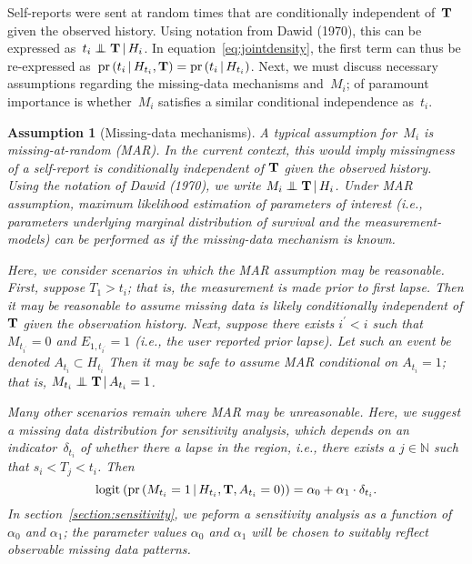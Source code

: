 \documentclass[11pt]{amsart}
\def\pr{\mathop{\text{pr}}\nolimits}
\def\pr{\mathop{\text{pr}}\nolimits}
\def\logit{\mathop{\text{logit}_{}}\nolimits}
\def\logit{\mathop{\text{logit}_{}}\nolimits}
\newtheorem{assumption}[thm]{Assumption}
\def\indep{\mathrel{\rlap{$\perp$}\kern1.6pt\mathord{\perp}}}
\def\given{\, | \,}
\def\Nat{\mathbb{N}}
\def\bfT{{\bf T}}
\begin{document}
Self-reports were sent at random times that are conditionally
independent of~$\bfT$ given the observed history. Using notation from
Dawid (1970), this can be expressed as~$t_i \indep \bfT \given
H_{i}$.  In equation~\eqref{eq:jointdensity}, the first term can thus
be re-expressed as~$\pr \left( t_i \given H_{t_i}, \bfT \right) = \pr
\left( t_i \given H_{t_i} \right)$.
Next, we must discuss necessary assumptions regarding the missing-data
mechanisms and~$M_{i}$; of paramount importance is whether~$M_{i}$
satisfies a similar conditional independence as~$t_i$.

\begin{assumption}[Missing-data mechanisms] \normalfont
A typical assumption for~$M_i$ is \emph{missing-at-random} (MAR). In
the current context, this would imply missingness of a self-report is
conditionally independent of $\bfT$ given the observed history. Using
the notation of Dawid (1970), we write $M_{i} \indep \bfT \given
H_{i}$. Under MAR assumption, maximum likelihood estimation of
parameters of interest (i.e., parameters underlying marginal
distribution of survival and the measurement-models) can be performed
as if the missing-data mechanism is known.

Here, we consider scenarios in which the MAR assumption may be
reasonable.
First, suppose $T_1 > t_i$; that is, the measurement is made
prior to first lapse. Then it may be reasonable to assume missing data
is likely conditionally independent of $\bfT$ given the observation
history.  Next, suppose there exists $i^\prime < i$ such that
$M_{t_{i^\prime}} = 0$ and $E_{1,t_{i^\prime}} = 1$ (i.e., the user
reported prior lapse). Let such an event be denoted $A_{t_i} \subset
H_{t_i}$ Then it may be safe to assume MAR conditional on $A_{t_i} =
1$; that is, $M_{t_i} \indep \bfT \given A_{t_i} = 1$.

Many other scenarios remain where MAR may be unreasonable.  Here, we
suggest a missing data distribution for sensitivity analysis, which
depends on an indicator~$\delta_{t_i}$ of whether there a lapse in the
region, i.e., there exists a $j \in \Nat$ such that $s_i < T_j <
t_i$. Then
\[
\logit \left( \pr \left( M_{t_i} = 1 \given H_{t_i}, \bfT, A_{t_i} = 0
  \right) \right) = \alpha_0 + \alpha_1 \cdot \delta_{t_i}.
\]
In section~\ref{section:sensitivity}, we peform a sensitivity analysis
as a function of $\alpha_0$ and $\alpha_1$; the parameter values
$\alpha_0$ and $\alpha_1$ will be chosen to suitably reflect
observable missing data patterns.
\end{assumption}
\end{document}
